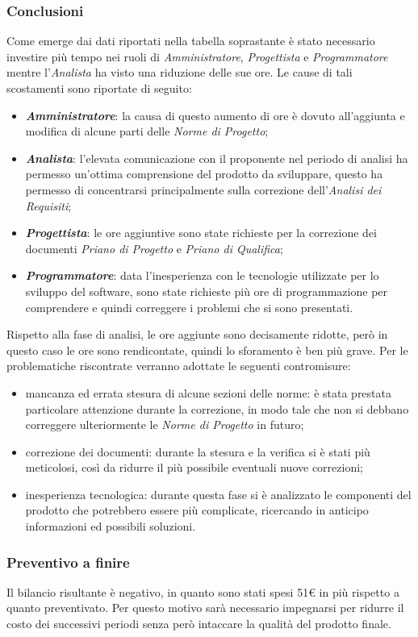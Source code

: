 \subsubsection{Conclusioni}
Come emerge dai dati riportati nella tabella soprastante è stato necessario investire più tempo nei ruoli di \textit{Amministratore}, \textit{Progettista} e \textit{Programmatore} mentre l'\textit{Analista} ha visto una riduzione delle sue ore. Le cause di tali scostamenti sono riportate di seguito:
\begin{itemize}
	\item \textbf{\textit{Amministratore}}: la causa di questo aumento di ore è dovuto all'aggiunta e modifica di alcune parti delle \textit{Norme di Progetto};
	\item \textbf{\textit{Analista}}: l'elevata comunicazione con il proponente nel periodo di analisi ha permesso un'ottima comprensione del prodotto da sviluppare, questo ha permesso di concentrarsi principalmente sulla correzione dell'\textit{Analisi dei Requisiti};
	\item \textbf{\textit{Progettista}}: le ore aggiuntive sono state richieste per la correzione dei documenti \textit{Priano di Progetto} e \textit{Priano di Qualifica};
	\item \textbf{\textit{Programmatore}}: data l'inesperienza con le tecnologie utilizzate per lo sviluppo del software, sono state richieste più ore di programmazione per comprendere e quindi correggere i problemi che si sono presentati.
\end{itemize}

Rispetto alla fase di analisi, le ore aggiunte sono decisamente ridotte, però in questo caso le ore sono rendicontate, quindi lo sforamento è ben più grave. Per le problematiche riscontrate verranno adottate le seguenti contromisure: 
\begin{itemize}
	\item mancanza ed errata stesura di alcune sezioni delle norme: è stata prestata particolare attenzione durante la correzione, in modo tale che non si debbano correggere ulteriormente le \textit{Norme di Progetto} in futuro;
	\item correzione dei documenti: durante la stesura e la verifica si è stati più meticolosi, così da ridurre il più possibile eventuali nuove correzioni;
	\item inesperienza tecnologica: durante questa fase si è analizzato le componenti del prodotto che potrebbero essere più complicate, ricercando in anticipo informazioni ed possibili soluzioni.
\end{itemize}

\subsubsection{Preventivo a finire}
Il bilancio risultante è negativo, in quanto sono stati spesi 51€ in più rispetto a quanto preventivato. Per questo motivo sarà necessario impegnarsi per ridurre il costo dei successivi periodi senza però intaccare la qualità del prodotto finale.